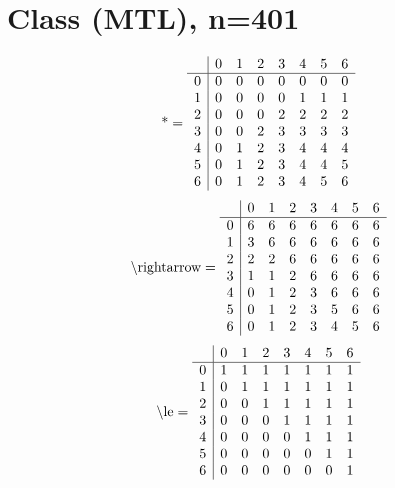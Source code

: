 \documentclass[11pt]{article}
\begin{document}
\section{Class (MTL), n=401}
\[\text{*} = 
\begin{array}{r | r r r r r r r}
 & 0 & 1 & 2 & 3 & 4 & 5 & 6 \\ \hline
0 & 0 & 0 & 0 & 0 & 0 & 0 & 0 \\
1 & 0 & 0 & 0 & 0 & 1 & 1 & 1 \\
2 & 0 & 0 & 0 & 2 & 2 & 2 & 2 \\
3 & 0 & 0 & 2 & 3 & 3 & 3 & 3 \\
4 & 0 & 1 & 2 & 3 & 4 & 4 & 4 \\
5 & 0 & 1 & 2 & 3 & 4 & 4 & 5 \\
6 & 0 & 1 & 2 & 3 & 4 & 5 & 6 \\
\end{array}
\]
\[\text{\textbackslash rightarrow} = 
\begin{array}{r | r r r r r r r}
 & 0 & 1 & 2 & 3 & 4 & 5 & 6 \\ \hline
0 & 6 & 6 & 6 & 6 & 6 & 6 & 6 \\
1 & 3 & 6 & 6 & 6 & 6 & 6 & 6 \\
2 & 2 & 2 & 6 & 6 & 6 & 6 & 6 \\
3 & 1 & 1 & 2 & 6 & 6 & 6 & 6 \\
4 & 0 & 1 & 2 & 3 & 6 & 6 & 6 \\
5 & 0 & 1 & 2 & 3 & 5 & 6 & 6 \\
6 & 0 & 1 & 2 & 3 & 4 & 5 & 6 \\
\end{array}
\]
\[\text{\textbackslash le} = 
\begin{array}{r | r r r r r r r}
 & 0 & 1 & 2 & 3 & 4 & 5 & 6 \\ \hline
0 & 1 & 1 & 1 & 1 & 1 & 1 & 1 \\
1 & 0 & 1 & 1 & 1 & 1 & 1 & 1 \\
2 & 0 & 0 & 1 & 1 & 1 & 1 & 1 \\
3 & 0 & 0 & 0 & 1 & 1 & 1 & 1 \\
4 & 0 & 0 & 0 & 0 & 1 & 1 & 1 \\
5 & 0 & 0 & 0 & 0 & 0 & 1 & 1 \\
6 & 0 & 0 & 0 & 0 & 0 & 0 & 1 \\
\end{array}
\]
\end{document}
